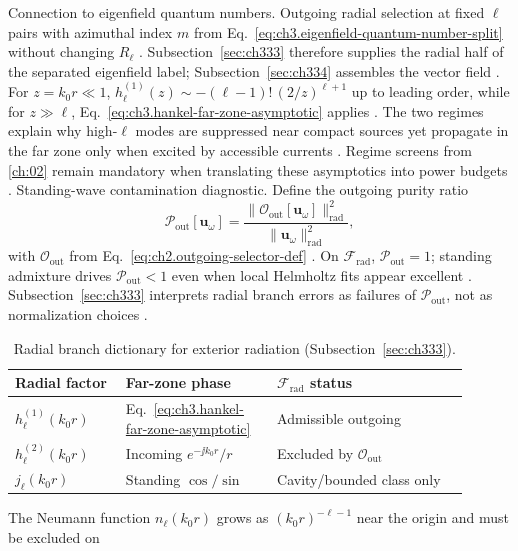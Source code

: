 Connection to eigenfield quantum numbers. Outgoing radial selection at fixed \(\ell\) pairs with azimuthal index \(m\) from
Eq.~\eqref{eq:ch3.eigenfield-quantum-number-split} without changing \(R_{\ell}\) .
Subsection~\ref{sec:ch333} therefore supplies the radial half of the separated eigenfield label; Subsection~\ref{sec:ch334}
assembles the vector field .
For \(z=k_{0}r\ll1\), \(h_{\ell}^{(1)}(z)\sim -(\ell-1)!\,(2/z)^{\ell+1}\) up to leading order, while for
\(z\gg\ell\), Eq.~\eqref{eq:ch3.hankel-far-zone-asymptotic} applies . The two
regimes explain why high-\(\ell\) modes are suppressed near compact sources yet propagate in the far zone only
when excited by accessible currents . Regime screens from \ref{ch:02}
remain mandatory when translating these asymptotics into power budgets .
Standing-wave contamination diagnostic. Define the outgoing purity ratio
\begin{equation}
\label{eq:ch3.outgoing-purity-ratio}
\mathcal{P}_{\mathrm{out}}[\mathbf{u}_\omega]
=
\frac{\|\mathcal{O}_{\mathrm{out}}[\mathbf{u}_\omega]\|_{\mathrm{rad}}^{2}}
{\|\mathbf{u}_\omega\|_{\mathrm{rad}}^{2}},
\end{equation}
with \(\mathcal{O}_{\mathrm{out}}\) from Eq.~\eqref{eq:ch2.outgoing-selector-def} . On
\(\mathcal{F}_{\mathrm{rad}}\), \(\mathcal{P}_{\mathrm{out}}=1\); standing admixture drives
\(\mathcal{P}_{\mathrm{out}}<1\) even when local Helmholtz fits appear excellent .
Subsection~\ref{sec:ch333} interprets radial branch errors as failures of \(\mathcal{P}_{\mathrm{out}}\), not as
normalization choices .
\begin{table}[t]
\centering
\caption{Radial branch dictionary for exterior radiation (Subsection~\ref{sec:ch333}).}
\label{tab:ch3.333-radial-branches}
\small
\begin{tabular}{@{}p{0.22\linewidth}p{0.30\linewidth}p{0.38\linewidth}@{}}
\toprule
Radial factor & Far-zone phase & \(\mathcal{F}_{\mathrm{rad}}\) status \\
\midrule
\(h_{\ell}^{(1)}(k_{0}r)\) &
Eq.~\eqref{eq:ch3.hankel-far-zone-asymptotic} &
Admissible outgoing \\
\addlinespace
\(h_{\ell}^{(2)}(k_{0}r)\) &
Incoming \(e^{-\jj k_{0}r}/r\) &
Excluded by \(\mathcal{O}_{\mathrm{out}}\) \\
\addlinespace
\(j_{\ell}(k_{0}r)\) &
Standing \(\cos/\sin\) &
Cavity/bounded class only \\
\bottomrule
\end{tabular}
\end{table}
The Neumann function \(n_{\ell}(k_{0}r)\) grows as \((k_{0}r)^{-\ell-1}\) near the origin and must be excluded on
